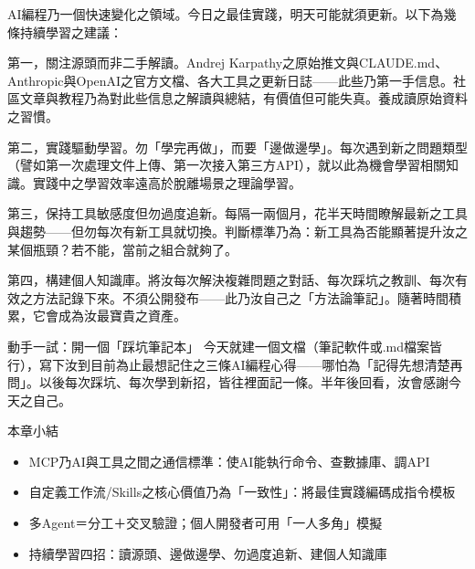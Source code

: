 
AI編程乃一個快速變化之領域。今日之最佳實踐，明天可能就須更新。以下為幾條持續學習之建議：

第一，關注源頭而非二手解讀。Andrej Karpathy之原始推文與CLAUDE.md、Anthropic與OpenAI之官方文檔、各大工具之更新日誌——此些乃第一手信息。社區文章與教程乃為對此些信息之解讀與總結，有價值但可能失真。養成讀原始資料之習慣。

第二，實踐驅動學習。勿「學完再做」，而要「邊做邊學」。每次遇到新之問題類型（譬如第一次處理文件上傳、第一次接入第三方API），就以此為機會學習相關知識。實踐中之學習效率遠高於脫離場景之理論學習。

第三，保持工具敏感度但勿過度追新。每隔一兩個月，花半天時間瞭解最新之工具與趨勢——但勿每次有新工具就切換。判斷標準乃為：新工具為否能顯著提升汝之某個瓶頸？若不能，當前之組合就夠了。

第四，構建個人知識庫。將汝每次解決複雜問題之對話、每次踩坑之教訓、每次有效之方法記錄下來。不須公開發布——此乃汝自己之「方法論筆記」。隨著時間積累，它會成為汝最寶貴之資產。

\begin{tcbpractice}{動手一試：開一個「踩坑筆記本」}
今天就建一個文檔（筆記軟件或.md檔案皆行），寫下汝到目前為止最想記住之三條AI編程心得——哪怕為「記得先想清楚再問」。以後每次踩坑、每次學到新招，皆往裡面記一條。半年後回看，汝會感謝今天之自己。

\end{tcbpractice}

\begin{tcbsummary}{本章小結}
\begin{itemize}
  \item MCP乃AI與工具之間之通信標準：使AI能執行命令、查數據庫、調API
  \item 自定義工作流/Skills之核心價值乃為「一致性」：將最佳實踐編碼成指令模板
  \item 多Agent＝分工＋交叉驗證；個人開發者可用「一人多角」模擬
  \item 持續學習四招：讀源頭、邊做邊學、勿過度追新、建個人知識庫
\end{itemize}

\end{tcbsummary}
